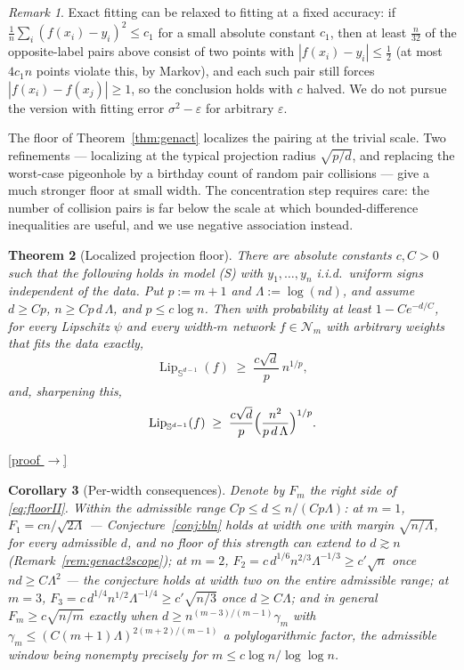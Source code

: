 \documentclass[11pt,reqno]{amsart}
\theoremstyle{plain}
\newtheorem{theorem}{Theorem}[section]
\newtheorem{corollary}[theorem]{Corollary}
\theoremstyle{definition}
\theoremstyle{remark}
\newtheorem{remark}[theorem]{Remark}
\newcommand{\Sd}{\mathbb{S}^{d-1}}
\newcommand{\eps}{\varepsilon}
\newcommand{\Lip}{\operatorname{Lip}}
\newcommand{\NN}{\mathcal{N}}
\newcommand{\proofbutton}[1]{\hyperref[proof:#1]{\textnormal{\footnotesize\textsf{[proof $\to$]}}}}
\begin{document}
\begin{remark}
Exact fitting can be relaxed to fitting at a fixed accuracy: if $\frac1n\sum_i(f(x_i)-y_i)^2\le c_1$ for a small absolute constant $c_1$, then at least $\tfrac n{32}$ of the opposite-label pairs above consist of two points with $|f(x_i)-y_i|\le\tfrac12$ (at most $4c_1n$ points violate this, by Markov), and each such pair still forces $|f(x_i)-f(x_j)|\ge1$, so the conclusion holds with $c$ halved. We do not pursue the version with fitting error $\sigma^2-\eps$ for arbitrary $\eps$.
\end{remark}

The floor of Theorem~\ref{thm:genact} localizes the pairing at the trivial scale. Two refinements --- localizing at the typical projection radius $\sqrt{p/d}$, and replacing the worst-case pigeonhole by a birthday count of random pair collisions --- give a much stronger floor at small width. The concentration step requires care: the number of collision pairs is far below the scale at which bounded-difference inequalities are useful, and we use negative association instead.

\begin{theorem}[Localized projection floor]\label{thm:genact2}
There are absolute constants $c,C>0$ such that the following holds in model (S) with $y_1,\dots,y_n$ i.i.d.\ uniform signs independent of the data. Put $p:=m+1$ and $\Lambda:=\log(nd)$, and assume $d\ge Cp$, $n\ge Cp\,d\,\Lambda$, and $p\le c\log n$. Then with probability at least $1-Ce^{-d/C}$, for \emph{every} Lipschitz $\psi$ and every width-$m$ network $f\in\NN_m$ with arbitrary weights that fits the data exactly,
\begin{equation}\label{eq:floorI}
\Lip_{\Sd}(f)\;\ge\;\frac{c\sqrt d}{p}\,n^{1/p},
\end{equation}
and, sharpening this,
\begin{equation}\label{eq:floorII}
\Lip_{\Sd}(f)\;\ge\;\frac{c\sqrt d}{p}\Bigl(\frac{n^2}{p\,d\,\Lambda}\Bigr)^{1/p}.
\end{equation}
\end{theorem}
\proofbutton{genact2}

\begin{corollary}[Per-width consequences]\label{cor:genactcurve}
Denote by $F_m$ the right side of \eqref{eq:floorII}. Within the admissible range $Cp\le d\le n/(Cp\Lambda)$:
at $m=1$, $F_1=cn/\sqrt{2\Lambda}$ --- Conjecture~\ref{conj:bln} holds at width one with margin $\sqrt{n/\Lambda}$, for every admissible $d$, and no floor of this strength can extend to $d\gtrsim n$ (Remark~\ref{rem:genact2scope});
at $m=2$, $F_2=c\,d^{1/6}n^{2/3}\Lambda^{-1/3}\ge c'\sqrt n$ once $nd\ge C\Lambda^2$ --- the conjecture holds at width two on the entire admissible range;
at $m=3$, $F_3=c\,d^{1/4}n^{1/2}\Lambda^{-1/4}\ge c'\sqrt{n/3}$ once $d\ge C\Lambda$;
and in general $F_m\ge c\sqrt{n/m}$ exactly when $d\ge n^{(m-3)/(m-1)}\gamma_m$ with $\gamma_m\le(C(m+1)\Lambda)^{2(m+2)/(m-1)}$ a polylogarithmic factor, the admissible window being nonempty precisely for $m\le c\log n/\log\log n$.
\end{corollary}
\end{document}
